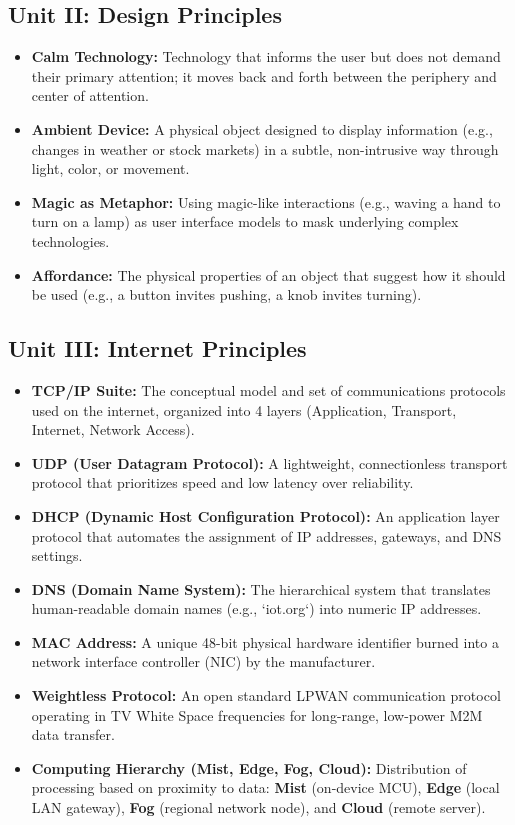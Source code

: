 \subsection{Unit II: Design Principles}
\begin{itemize}
  \item   \textbf{Calm Technology:} Technology that informs the user but does not demand their primary attention; it moves back and forth between the periphery and center of attention.
  \item   \textbf{Ambient Device:} A physical object designed to display information (e.g., changes in weather or stock markets) in a subtle, non-intrusive way through light, color, or movement.
  \item   \textbf{Magic as Metaphor:} Using magic-like interactions (e.g., waving a hand to turn on a lamp) as user interface models to mask underlying complex technologies.
  \item   \textbf{Affordance:} The physical properties of an object that suggest how it should be used (e.g., a button invites pushing, a knob invites turning).
\end{itemize}

\subsection{Unit III: Internet Principles}
\begin{itemize}
  \item   \textbf{TCP/IP Suite:} The conceptual model and set of communications protocols used on the internet, organized into 4 layers (Application, Transport, Internet, Network Access).
  \item   \textbf{UDP (User Datagram Protocol):} A lightweight, connectionless transport protocol that prioritizes speed and low latency over reliability.
  \item   \textbf{DHCP (Dynamic Host Configuration Protocol):} An application layer protocol that automates the assignment of IP addresses, gateways, and DNS settings.
  \item   \textbf{DNS (Domain Name System):} The hierarchical system that translates human-readable domain names (e.g., `iot.org`) into numeric IP addresses.
  \item   \textbf{MAC Address:} A unique 48-bit physical hardware identifier burned into a network interface controller (NIC) by the manufacturer.
  \item   \textbf{Weightless Protocol:} An open standard LPWAN communication protocol operating in TV White Space frequencies for long-range, low-power M2M data transfer.
  \item   \textbf{Computing Hierarchy (Mist, Edge, Fog, Cloud):} Distribution of processing based on proximity to data: \textbf{Mist} (on-device MCU), \textbf{Edge} (local LAN gateway), \textbf{Fog} (regional network node), and \textbf{Cloud} (remote server).
\end{itemize}


